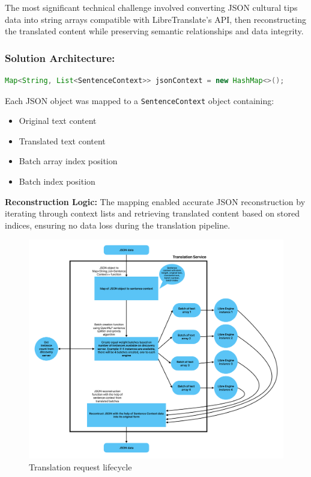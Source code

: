 The most significant technical challenge involved converting JSON cultural tips data into string arrays compatible with LibreTranslate's API, then reconstructing the translated content while preserving semantic relationships and data integrity.

\subsubsection{Solution Architecture:}
\begin{lstlisting}[language=Java]
Map<String, List<SentenceContext>> jsonContext = new HashMap<>();
\end{lstlisting}

Each JSON object was mapped to a \texttt{SentenceContext} object containing:
\begin{itemize}
    \item Original text content
    \item Translated text content
    \item Batch array index position
    \item Batch index position
\end{itemize}

\textbf{Reconstruction Logic:} The mapping enabled accurate JSON reconstruction by iterating through context lists and retrieving translated content based on stored indices, ensuring no data loss during the translation pipeline.

\begin{figure}[H]
    \centering
    \includegraphics[width=1\linewidth]{chapter/05_implementation/backend/B_architectural_design/Translation_Service.pdf}
    \caption{Translation request lifecycle}
    \label{fig:translation_engine_radar}
\end{figure}